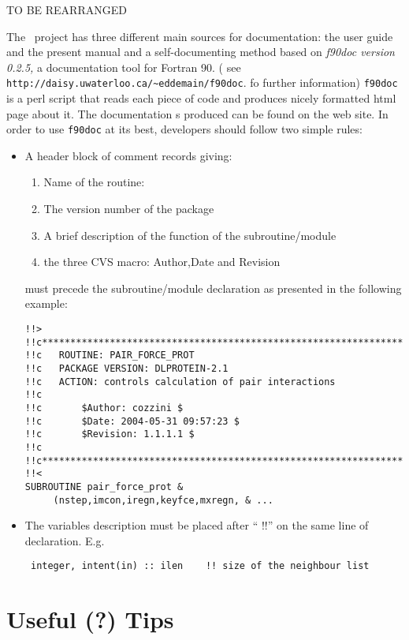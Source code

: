 TO BE REARRANGED 



The \PR\ project has three different main sources for documentation: the
user guide and the present manual and a  self-documenting method based on
{\em f90doc version 0.2.5,} a documentation tool for Fortran 90. 
( see \verb=http://daisy.uwaterloo.ca/~eddemain/f90doc=. fo further information)
\verb=f90doc= is a perl script that reads each piece of code  
and produces nicely formatted html page about it. The documentation s 
produced can be found on the \PR web site.  In order to use \verb=f90doc=
at its best, developers should follow two simple rules:

\begin{itemize}
\item A header block of \fort comment records giving:
\begin{enumerate}
\item Name of the routine: 
\item The version number of the package
\item A brief description of the function of the subroutine/module
\item the three CVS macro: Author,Date and Revision  
\end{enumerate}
must precede the subroutine/module declaration as presented in the
following example:

\begin{verbatim}
!!>
!!c***********************************************************************
!!c   ROUTINE: PAIR_FORCE_PROT   
!!c   PACKAGE VERSION: DLPROTEIN-2.1
!!c   ACTION: controls calculation of pair interactions
!!c 
!!c       $Author: cozzini $
!!c       $Date: 2004-05-31 09:57:23 $
!!c       $Revision: 1.1.1.1 $
!!c
!!c***********************************************************************
!!<
SUBROUTINE pair_force_prot &
     (nstep,imcon,iregn,keyfce,mxregn, & ...
\end{verbatim}

\item The variables description must be placed after `` !!'' on the same line
of declaration. E.g.

\begin{verbatim}
 integer, intent(in) :: ilen    !! size of the neighbour list 
\end{verbatim}    


\end{itemize} 

\chapter{ Useful (?) Tips }
